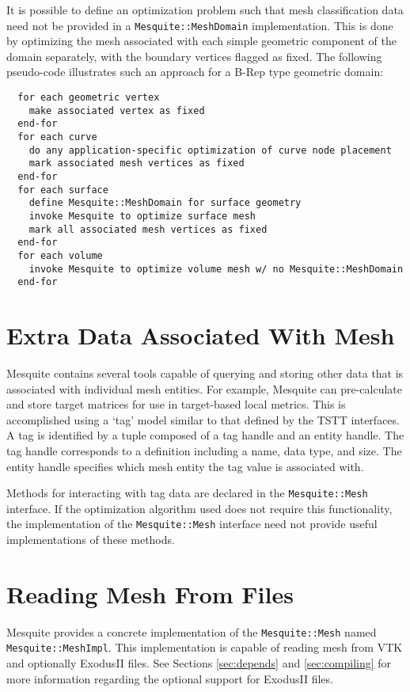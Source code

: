 It is possible to define an optimization problem such that mesh classification
data need not be provided in a \texttt{Mesquite::MeshDomain} implementation. 
This is done by optimizing the mesh associated with each simple geometric
component of the domain separately, with the boundary vertices flagged as fixed.
The following pseudo-code illustrates such an approach for a B-Rep type geometric
domain:
\begin{verbatim}
  for each geometric vertex
    make associated vertex as fixed
  end-for
  for each curve
    do any application-specific optimization of curve node placement
    mark associated mesh vertices as fixed
  end-for
  for each surface
    define Mesquite::MeshDomain for surface geometry
    invoke Mesquite to optimize surface mesh
    mark all associated mesh vertices as fixed
  end-for
  for each volume
    invoke Mesquite to optimize volume mesh w/ no Mesquite::MeshDomain
  end-for
\end{verbatim}

\section{Extra Data Associated With Mesh} \label{tags}

Mesquite contains several tools capable of querying and storing other
data that is associated with individual mesh entities.  For example, Mesquite
can pre-calculate and store target matrices for use in target-based local
metrics.  This is accomplished
using a `tag' model similar to that defined by the TSTT\cite{tstt} interfaces.
A tag is identified by a tuple composed of a tag handle and an entity handle. 
The tag handle corresponds to a definition including a name, data type, and size.
 The entity handle specifies which mesh entity the tag value is associated with. 
 
Methods for interacting with tag data are declared in the \texttt{Mesquite::Mesh}
interface.  If the optimization algorithm used does not require this
functionality, the implementation of the \texttt{Mesquite::Mesh} interface
need not provide useful implementations of these methods.
 
\section{Reading Mesh From Files} \label{sec:meshFiles}

Mesquite provides a concrete implementation of the \texttt{Mesquite::Mesh} named
\texttt{Mesquite::MeshImpl}.  This implementation is capable of reading mesh from
VTK\cite{VTKbook, VTKuml} and optionally ExodusII files. See Sections 
\ref{sec:depends} and \ref{sec:compiling} for more 
information regarding the optional support for ExodusII files.

